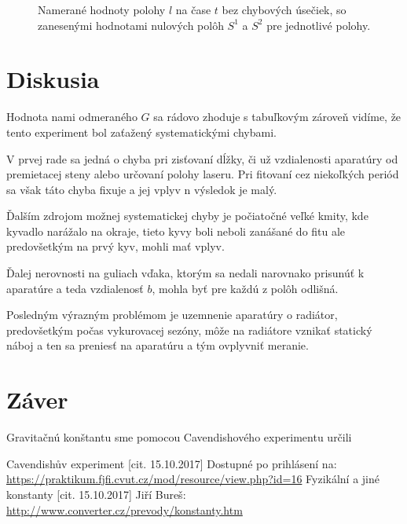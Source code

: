 \documentclass[10pt]{scrartcl}
\begin{document}
\begin{figure}

\caption{Namerané hodnoty polohy $l$ na čase $t$ bez chybových úsečiek, so zanesenými hodnotami nulových polôh $S^1$ a $S^2$ pre jednotlivé polohy.}  \label{G_4}

\end{figure}
\section{Diskusia}

Hodnota nami odmeraného $G$ sa rádovo zhoduje s tabuľkovým\cite{C_2} 
zároveň vidíme, že tento experiment bol zaťažený systematickými chybami. 

V prvej rade sa jedná o chyba pri zisťovaní dĺžky,
či už vzdialenosti aparatúry od premietacej steny alebo určovaní polohy laseru.
Pri fitovaní cez niekoľkých periód sa však táto chyba fixuje a jej vplyv n výsledok je malý.

Ďalším zdrojom možnej systematickej chyby je počiatočné veľké kmity, kde kyvadlo narážalo na okraje, tieto kyvy boli neboli zanášané do fitu ale predovšetkým na prvý kyv, mohli mať vplyv.

Ďalej nerovnosti na guliach vďaka, ktorým sa nedali narovnako prisunúť k aparatúre a teda vzdialenosť $b$, mohla byť pre každú z polôh odlišná.

Posledným výrazným problémom je uzemnenie aparatúry o radiátor, predovšetkým počas vykurovacej sezóny, môže na radiátore vznikať statický náboj a ten sa preniesť na aparatúru a tým ovplyvniť meranie.


\section{Záver}
Gravitačnú konštantu sme pomocou Cavendishového experimentu určili

\begin{thebibliography}{2}
Cavendishův experiment [cit. 15.10.2017] Dostupné po prihlásení na: \url{https://praktikum.fjfi.cvut.cz/mod/resource/view.php?id=16}
Fyzikální a jiné konstanty [cit. 15.10.2017] Jiří Bureš: \url{http://www.converter.cz/prevody/konstanty.htm}

\end{thebibliography}
\end{document}
